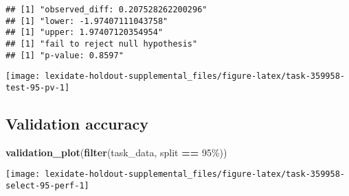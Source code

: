 \documentclass[
]{book}
\newenvironment{Shaded}{\begin{snugshade}}{\end{snugshade}}
\newcommand{\AttributeTok}[1]{\textcolor[rgb]{0.13,0.29,0.53}{#1}}
\newcommand{\DecValTok}[1]{\textcolor[rgb]{0.00,0.00,0.81}{#1}}
\newcommand{\FunctionTok}[1]{\textcolor[rgb]{0.13,0.29,0.53}{\textbf{#1}}}
\newcommand{\NormalTok}[1]{#1}
\newcommand{\OtherTok}[1]{\textcolor[rgb]{0.56,0.35,0.01}{#1}}
\newcommand{\SpecialCharTok}[1]{\textcolor[rgb]{0.81,0.36,0.00}{\textbf{#1}}}
\newcommand{\StringTok}[1]{\textcolor[rgb]{0.31,0.60,0.02}{#1}}
\begin{document}
\begin{Shaded}
\end{Shaded}

\begin{verbatim}
## [1] "observed_diff: 0.207528262200296"
## [1] "lower: -1.97407111043758"
## [1] "upper: 1.97407120354954"
## [1] "fail to reject null hypothesis"
## [1] "p-value: 0.8597"
\end{verbatim}

\texttt{[image: lexidate-holdout-supplemental\_files/figure-latex/task-359958-test-95-pv-1]}

\hypertarget{validation-accuracy-34}{%
\subsection{Validation accuracy}\label{validation-accuracy-34}}

\begin{Shaded}
\begin{Highlighting}[]
\FunctionTok{validation\_plot}\NormalTok{(}\FunctionTok{filter}\NormalTok{(task\_data, split }\SpecialCharTok{==} \StringTok{\textquotesingle{}95\%\textquotesingle{}}\NormalTok{))}
\end{Highlighting}
\end{Shaded}

\texttt{[image: lexidate-holdout-supplemental\_files/figure-latex/task-359958-select-95-perf-1]}
\end{document}
